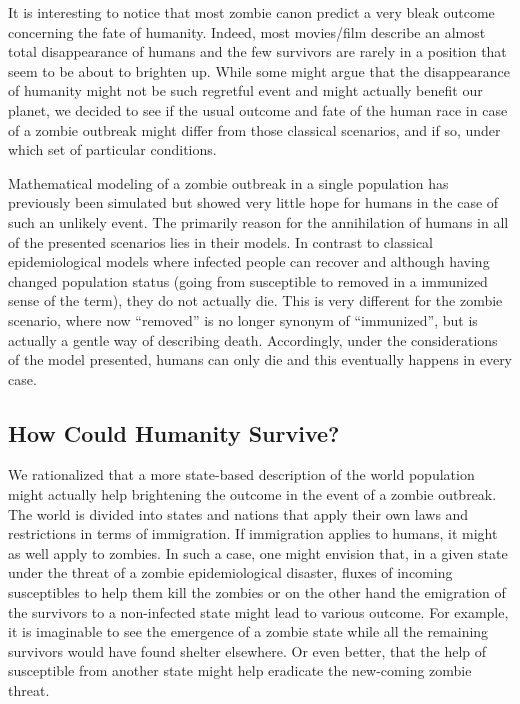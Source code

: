 \documentclass[11pt]{article} %
\begin{document}
It is interesting to notice that most zombie canon predict a very bleak outcome concerning the fate of humanity. Indeed, most movies/film describe an almost total disappearance of humans and the few survivors are rarely in a position that seem to be about to brighten up. While some might argue that the disappearance of humanity might not be such regretful event and might actually benefit our planet, we decided to see if the usual outcome and fate of the human race in case of a zombie outbreak might differ from those classical scenarios, and if so, under which set of particular conditions. 

Mathematical modeling of a zombie outbreak in a single population has previously been simulated \cite{munz2009zombies} but showed very little hope for humans in the case of such an unlikely event. The primarily reason for the annihilation of humans in all of the presented scenarios lies in their models. In contrast to classical epidemiological models where infected people can recover and although having changed population status (going from susceptible to removed in a immunized sense of the term), they do not actually die. This is very different for the zombie scenario, where now ``removed'' is no longer synonym of ``immunized'', but is actually a gentle way of describing death. Accordingly, under the considerations of the model presented, humans can only die and this eventually happens in every case.

\subsection{How Could Humanity Survive?}\indent

We rationalized that a more state-based description of the world population might actually help brightening the outcome in the event of a zombie outbreak. The world is divided into states and nations that apply their own laws and restrictions in terms of immigration. If immigration applies to humans, it might as well apply to zombies. In such a case, one might envision that, in a given state under the threat of a zombie epidemiological disaster, fluxes of incoming susceptibles to help them kill the zombies or on the other hand the emigration of the survivors to a non-infected state might lead to various outcome. For example, it is imaginable to see the emergence of a zombie state while all the remaining survivors would have found shelter elsewhere. Or even better, that the help of susceptible from another state might help eradicate the new-coming zombie threat. 
\end{document}
